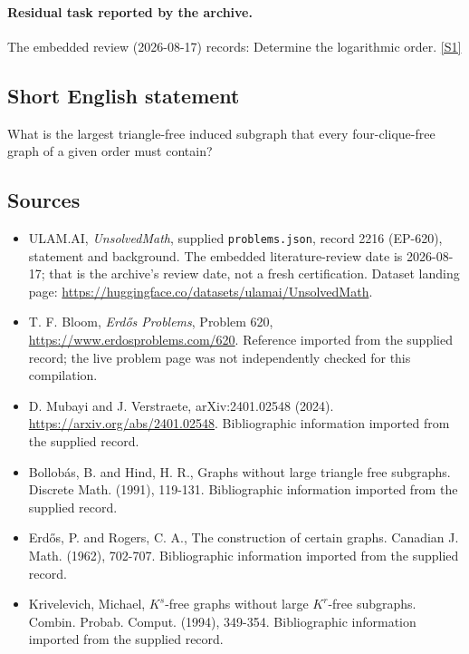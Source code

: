 \documentclass[11pt,a4paper]{article}
\newcommand{\sref}[2]{\hyperlink{source:#1:#2}{[S#2]}}
\begin{document}
\paragraph{Residual task reported by the archive.}

The embedded review (2026-08-17) records: Determine the logarithmic order. \sref{2216}{1}

\subsection{Short English statement}

What is the largest triangle-free induced subgraph that every four-clique-free graph of a given order must contain?

\subsection{Sources}

{\small

\begin{itemize}

\item[\hypertarget{source:2216:1}{S1}] ULAM.AI, \emph{UnsolvedMath}, supplied \texttt{problems.json}, record 2216 (EP-620), statement and background. The embedded literature-review date is 2026-08-17; that is the archive’s review date, not a fresh certification. Dataset landing page: \url{https://huggingface.co/datasets/ulamai/UnsolvedMath}.

\item[\hypertarget{source:2216:2}{S2}] T. F. Bloom, \emph{Erdős Problems}, Problem 620, \url{https://www.erdosproblems.com/620}. Reference imported from the supplied record; the live problem page was not independently checked for this compilation.

\item[\hypertarget{source:2216:3}{S3}] D. Mubayi and J. Verstraete, arXiv:2401.02548 (2024). \url{https://arxiv.org/abs/2401.02548}. Bibliographic information imported from the supplied record.

\item[\hypertarget{source:2216:4}{S4}] Bollob\'{a}s, B. and Hind, H. R., Graphs without large triangle free subgraphs. Discrete Math. (1991), 119-131. Bibliographic information imported from the supplied record.

\item[\hypertarget{source:2216:5}{S5}] Erd\H{o}s, P. and Rogers, C. A., The construction of certain graphs. Canadian J. Math. (1962), 702-707. Bibliographic information imported from the supplied record.

\item[\hypertarget{source:2216:6}{S6}] Krivelevich, Michael, {$K^s$}-free graphs without large {$K^r$}-free subgraphs. Combin. Probab. Comput. (1994), 349-354. Bibliographic information imported from the supplied record.

\end{itemize}

}

\label{end:2216}
\end{document}
